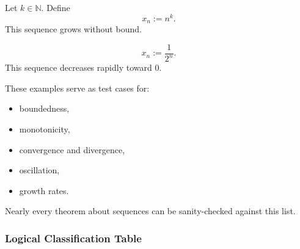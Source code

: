 \begin{tcolorbox}[colback=propbox, colframe=propborder, arc=2pt,
  left=6pt, right=6pt, top=4pt, bottom=4pt,
  title={\small\textbf{Example (Polynomial growth sequence)}},
  fonttitle=\small\bfseries]
Let $k\in\mathbb{N}$. Define
\[
x_n := n^k.
\]
This sequence grows without bound.
\end{tcolorbox}

\begin{tcolorbox}[colback=propbox, colframe=propborder, arc=2pt,
  left=6pt, right=6pt, top=4pt, bottom=4pt,
  title={\small\textbf{Example (Exponential decay sequence)}},
  fonttitle=\small\bfseries]
\[
x_n := \frac{1}{2^n}.
\]
This sequence decreases rapidly toward $0$.
\end{tcolorbox}

\begin{remark}
These examples serve as test cases for:
\begin{itemize}
\item boundedness,
\item monotonicity,
\item convergence and divergence,
\item oscillation,
\item growth rates.
\end{itemize}
Nearly every theorem about sequences can be sanity-checked against this list.
\end{remark}

\subsubsection{Logical Classification Table}


